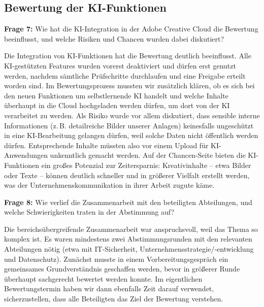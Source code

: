 \documentclass[
    12pt, 
    a4paper,
    ]{scrartcl} %
\begin{document}
\subsection*{Bewertung der KI-Funktionen}

\textbf{Frage 7:} Wie hat die KI-Integration in der Adobe Creative Cloud die Bewertung beeinflusst, und welche Risiken und Chancen wurden dabei diskutiert?  

Die Integration von KI-Funktionen hat die Bewertung deutlich beeinflusst. Alle KI-gestützten Features wurden vorerst deaktiviert und dürfen erst genutzt werden, nachdem sämtliche Prüfschritte durchlaufen und eine Freigabe erteilt worden sind. Im Bewertungsprozess mussten wir zusätzlich klären, ob es sich bei den neuen Funktionen um selbstlernende KI handelt und welche Inhalte überhaupt in die Cloud hochgeladen werden dürfen, um dort von der KI verarbeitet zu werden. Als Risiko wurde vor allem diskutiert, dass sensible interne Informationen (z.\,B. detailreiche Bilder unserer Anlagen) keinesfalls ungeschützt in eine KI-Bearbeitung gelangen dürfen, weil solche Daten nicht öffentlich werden dürfen. Entsprechende Inhalte müssten also vor einem Upload für KI-Anwendungen unkenntlich gemacht werden. Auf der Chancen-Seite bieten die KI-Funktionen ein großes Potenzial zur Zeitersparnis: Kreativinhalte – etwa Bilder oder Texte – können deutlich schneller und in größerer Vielfalt erstellt werden, was der Unternehmenskommunikation in ihrer Arbeit zugute käme.  

\textbf{Frage 8:} Wie verlief die Zusammenarbeit mit den beteiligten Abteilungen, und welche Schwierigkeiten traten in der Abstimmung auf?  

Die bereichsübergreifende Zusammenarbeit war anspruchsvoll, weil das Thema so komplex ist. Es waren mindestens zwei Abstimmungsrunden mit den relevanten Abteilungen nötig (etwa mit IT-Sicherheit, Unternehmensstrategie/-entwicklung und Datenschutz). Zunächst musste in einem Vorbereitungsgespräch ein gemeinsames Grundverständnis geschaffen werden, bevor in größerer Runde überhaupt sachgerecht bewertet werden konnte. Im eigentlichen Bewertungstermin haben wir dann ebenfalls Zeit darauf verwendet, sicherzustellen, dass alle Beteiligten das Ziel der Bewertung verstehen. 
\end{document}
